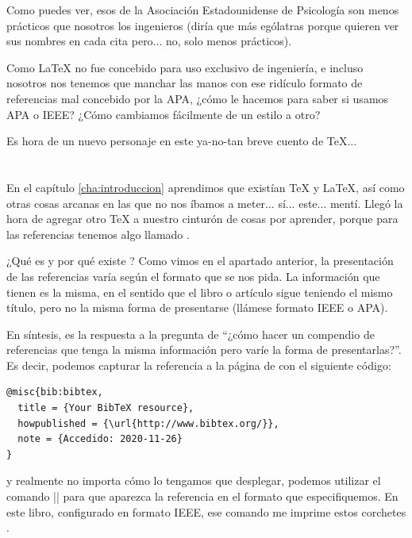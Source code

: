 Como puedes ver, esos de la Asociación Estadounidense de Psicología son menos prácticos que nosotros los ingenieros (diría que más ególatras porque quieren ver sus nombres en cada cita pero... no, solo menos prácticos).

Como \LaTeX{} no fue concebido para uso exclusivo de ingeniería, e incluso nosotros nos tenemos que manchar las manos con ese ridículo formato de referencias mal concebido por la APA, ¿cómo le hacemos para saber si usamos APA o IEEE? ¿Cómo cambiamos fácilmente de un estilo a otro?

Es hora de un nuevo personaje en este ya-no-tan breve cuento de \TeX...



\section{\BibTeX}
\label{sec:bibtex}



En el capítulo \ref{cha:introduccion} aprendimos que existían \TeX{} y \LaTeX{}, así como otras cosas arcanas en las que no nos íbamos a meter... sí... este... mentí. Llegó la hora de agregar otro \TeX{} a nuestro cinturón de cosas por aprender, porque para las referencias tenemos algo llamado \BibTeX.

¿Qué es y por qué existe \BibTeX? Como vimos en el apartado anterior, la presentación de las referencias varía según el formato que se nos pida. La información que tienen es la misma, en el sentido que el libro o artículo sigue teniendo el mismo título, pero no la misma forma de presentarse (llámese formato IEEE o APA).

En síntesis, \BibTeX{} es la respuesta a la pregunta de ``¿cómo hacer un compendio de referencias que tenga la misma información pero varíe la forma de presentarlas?''. Es decir, podemos capturar la referencia a la página de \BibTeX{} con el siguiente código:

\begin{lstlisting}[style=bibtex]
@misc{bib:bibtex,
  title = {Your BibTeX resource},
  howpublished = {\url{http://www.bibtex.org/}},
  note = {Accedido: 2020-11-26}
}
\end{lstlisting}

\noindent y realmente no importa cómo lo tengamos que desplegar, podemos utilizar el comando |\cite{bib:bibtex}| para que aparezca la referencia en el formato que especifiquemos. En este libro, configurado en formato IEEE, ese comando me imprime estos corchetes \cite{bib:bibtex}.

